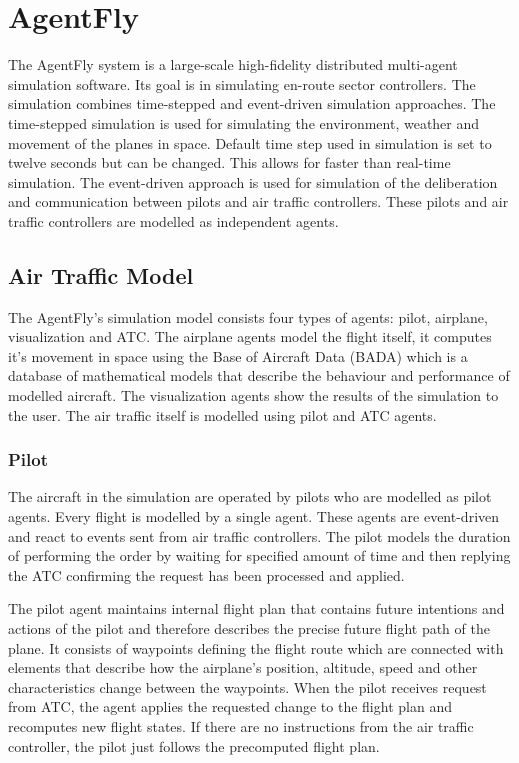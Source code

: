 \chapter{AgentFly}

The AgentFly system is a large-scale high-fidelity distributed multi-agent simulation software. \cite{agentfly-enroute} Its goal is in simulating en-route sector controllers. The simulation combines time-stepped and event-driven simulation approaches. \cite{agentfly-atm} The time-stepped simulation is used for simulating the environment, weather and movement of the planes in space. Default time step used in simulation is set to twelve seconds but can be changed. This allows for faster than real-time simulation. The event-driven approach is used for simulation of the deliberation and communication between pilots and air traffic controllers. These pilots and air traffic controllers are modelled as independent agents.

\section{Air Traffic Model}

The AgentFly's simulation model consists four types of agents: pilot, airplane, visualization and ATC. The airplane agents model the flight itself, it computes it's movement in space using the Base of Aircraft Data (BADA) which is a database of mathematical models that describe the behaviour and performance of modelled aircraft. \cite{bada} The visualization agents show the results of the simulation to the user. The air traffic itself is modelled using pilot and ATC agents.

\subsection{Pilot}

The aircraft in the simulation are operated by pilots who are modelled as pilot agents. Every flight is modelled by a single agent. These agents are event-driven and react to events sent from air traffic controllers. The pilot models the duration of performing the order by waiting for specified amount of time and then replying the ATC confirming the request has been processed and applied.

The pilot agent maintains internal flight plan that contains future intentions and actions of the pilot and therefore describes the precise future flight path of the plane. It consists of waypoints defining the flight route which are connected with elements that describe how the airplane's position, altitude, speed and other characteristics change between the waypoints. When the pilot receives request from ATC, the agent applies the requested change to the flight plan and recomputes new flight states. If there are no instructions from the air traffic controller, the pilot just follows the precomputed flight plan.

